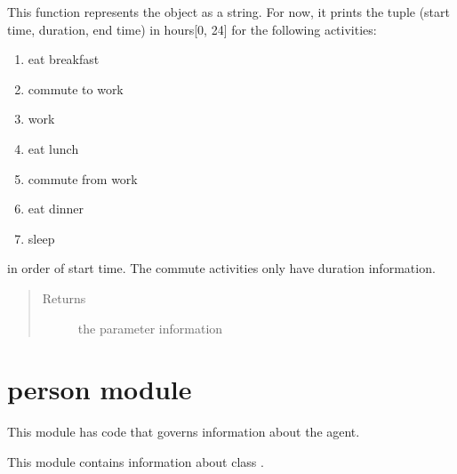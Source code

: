 \documentclass[letterpaper,10pt,english]{sphinxmanual}
\begin{document}
\begin{fulllineitems}
\begin{fulllineitems}
\end{fulllineitems}


\begin{fulllineitems}
\label{params:params.Params.toString}
This function represents the {\hyperref[params:params.Params]{\emph{}}} object as a string. For now, it prints         the tuple (start time, duration, end time) in hours{[}0, 24{]} for the following activities:
\begin{enumerate}
\item {} 
eat breakfast

\item {} 
commute to work

\item {} 
work

\item {} 
eat lunch

\item {} 
commute from work

\item {} 
eat dinner

\item {} 
sleep

\end{enumerate}

in order of start time. The commute activities only have duration information.
\begin{quote}\begin{description}
\item[{Returns}] \leavevmode
the parameter information

\end{description}\end{quote}

\end{fulllineitems}


\end{fulllineitems}



\section{person module}
\label{person::doc}\label{person:module-person}\label{person:person-module}
This module has code that governs information about the agent.

This module contains information about class {\hyperref[person:person.Person]{\emph{}}}.
\end{document}
